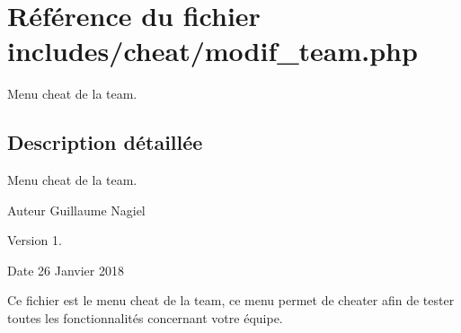 \hypertarget{modif__team_8php}{}\section{Référence du fichier includes/cheat/modif\+\_\+team.php}
\label{modif__team_8php}


Menu cheat de la team.  




\subsection{Description détaillée}
Menu cheat de la team. 

\begin{DoxyAuthor}{Auteur}
Guillaume Nagiel 
\end{DoxyAuthor}
\begin{DoxyVersion}{Version}
1. 
\end{DoxyVersion}
\begin{DoxyDate}{Date}
26 Janvier 2018
\end{DoxyDate}
Ce fichier est le menu cheat de la team, ce menu permet de cheater afin de tester toutes les fonctionnalités concernant votre équipe. 